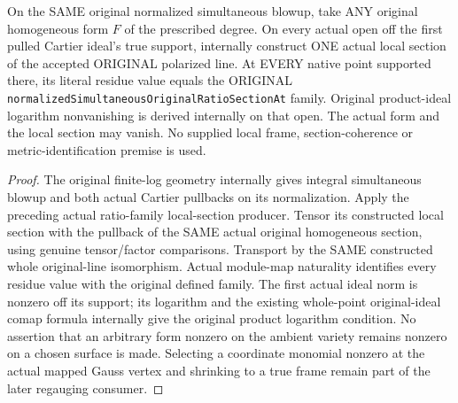 \begin{lemma}
\label{lem:intrinsic-numerical-original-polarized-section-local-coherence}
\leanok
{}
On the SAME original normalized simultaneous blowup, take ANY original
homogeneous form $F$ of the prescribed degree. On every actual open off the
first pulled Cartier ideal's true support, internally construct ONE actual
local section of the accepted ORIGINAL polarized line. At EVERY native
point supported there, its literal residue value equals the ORIGINAL
\texttt{normalizedSimultaneousOriginalRatioSectionAt} family. Original
product-ideal logarithm nonvanishing is derived internally on that open.
The actual form and the local section may vanish. No supplied local frame,
section-coherence or metric-identification premise is used.
\end{lemma}
\begin{proof}
The original finite-log geometry internally gives integral simultaneous
blowup and both actual Cartier pullbacks on its normalization. Apply the
preceding actual ratio-family local-section producer. Tensor its constructed
local section with the pullback of the SAME actual original homogeneous
section, using genuine tensor/factor comparisons. Transport by the SAME
constructed whole original-line isomorphism. Actual module-map naturality
identifies every residue value with the original defined family. The first
actual ideal norm is nonzero off its support; its logarithm and the existing
whole-point original-ideal comap formula internally give the original
product logarithm condition. No assertion that an arbitrary form nonzero on
the ambient variety remains nonzero on a chosen surface is made. Selecting
a coordinate monomial nonzero at the actual mapped Gauss vertex and
shrinking to a true frame remain part of the later regauging consumer.
\end{proof}


